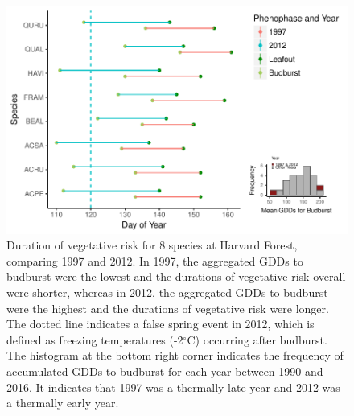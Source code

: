 \documentclass{article}\usepackage[]{graphicx}\usepackage[]{color}
\makeatletter
\def\maxwidth{ %
  \ifdim\Gin@nat@width>\linewidth
    \linewidth
  \else
    \Gin@nat@width
  \fi
}
\makeatother
\begin{document}
\begin{figure}[H]

{\centering \includegraphics[width=\maxwidth]{figure/hf-1} 

}

\caption[Duration of vegetative risk for 8 species at Harvard Forest, comparing 1997 and 2012]{Duration of vegetative risk for 8 species at Harvard Forest, comparing 1997 and 2012. In 1997, the aggregated GDDs to budburst were the lowest and the durations of vegetative risk overall were shorter, whereas in 2012, the aggregated GDDs to budburst were the highest and the durations of vegetative risk were longer. The dotted line indicates a false spring event in 2012, which is defined as freezing temperatures (-2$^\circ$C) occurring after budburst. The histogram at the bottom right corner indicates the frequency of accumulated GDDs to budburst for each year between 1990 and 2016. It indicates that 1997 was a thermally late year and 2012 was a thermally early year. }\label{fig:hf}
\end{figure}
\end{document}
